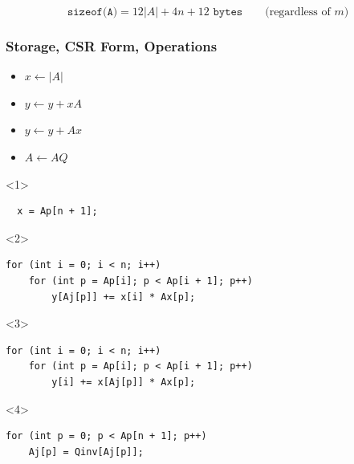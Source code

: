 \documentclass[xcolor={rgb,x11names,svgnames},rgb,x11names,svgnames]{beamer}
\begin{document}
\begin{frame}[fragile]
\[
\texttt{sizeof(A)} =  12 |A| + 4n + 12 \texttt{ bytes} \qquad\text{(regardless of $m$)}
\]


\end{frame}


\begin{frame}[fragile]
\frametitle{Storage, CSR Form, Operations}

\begin{itemize}
\item $x \gets |A|$  
\item<2-> $y \gets y + x A$
\item<3-> $y \gets y + A x$
\item<4-> $A \gets A Q$
\end{itemize}

\begin{overlayarea}{\textwidth}{3cm}

\begin{onlyenv}<1>
\begin{verbatim}
  x = Ap[n + 1];
\end{verbatim}
\end{onlyenv}

\begin{onlyenv}<2>
\begin{verbatim}
for (int i = 0; i < n; i++)
    for (int p = Ap[i]; p < Ap[i + 1]; p++)
        y[Aj[p]] += x[i] * Ax[p];
\end{verbatim}
\end{onlyenv}

\begin{onlyenv}<3>
\begin{verbatim}
for (int i = 0; i < n; i++)
    for (int p = Ap[i]; p < Ap[i + 1]; p++)
        y[i] += x[Aj[p]] * Ax[p];
\end{verbatim}
\end{onlyenv}

\begin{onlyenv}<4>
\begin{verbatim}
for (int p = 0; p < Ap[n + 1]; p++)
    Aj[p] = Qinv[Aj[p]];
\end{verbatim}
\end{onlyenv}


\end{overlayarea}
\end{frame}
\end{document}
